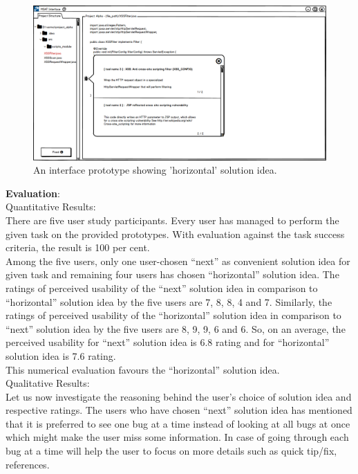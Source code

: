 \begin{figure}[hbt!]
	\centering
	\includegraphics[width=\linewidth]{figures/solution_ideas_snaps/S31_horizontal}
	\caption{An interface prototype showing 'horizontal' solution idea.}
	\label{fig:S31_horizontal2}
\end{figure} 


\textbf{Evaluation}: \\

Quantitative Results: \\

There are five user study participants. Every user has managed to perform the given task on the provided prototypes. With evaluation against the task success criteria, the result is 100 per cent. \\

Among the five users, only one user-chosen “next” as convenient solution idea for given task and remaining four users has chosen “horizontal” solution idea. The ratings of perceived usability of the “next” solution idea in comparison to “horizontal” solution idea by the five users are 7, 8, 8, 4 and 7. Similarly, the ratings of perceived usability of the “horizontal” solution idea in comparison to “next” solution idea by the five users are 8, 9, 9, 6 and 6. So, on an average, the perceived usability for “next” solution idea is 6.8 rating and for “horizontal” solution idea is 7.6 rating. \\

This numerical evaluation favours the “horizontal” solution idea. \\

Qualitative Results: \\

Let us now investigate the reasoning behind the user’s choice of solution idea and respective ratings. The users who have chosen “next” solution idea has mentioned that it is preferred to see one bug at a time instead of looking at all bugs at once which might make the user miss some information. In case of going through each bug at a time will help the user to focus on more details such as quick tip/fix, references. \\

